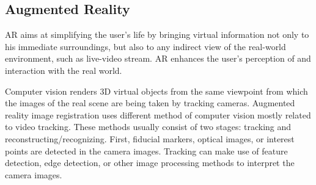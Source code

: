 



\subsection{Augmented Reality}
\label{sec:augmented_reality}

\gls{AR} aims at simplifying the user’s life by bringing virtual information not
only to his immediate surroundings, but also to any indirect view of the real-world
environment, such as live-video stream. \gls{AR} enhances the user’s perception of and
interaction with the real world. 

Computer vision renders \gls{3D} virtual objects from the same viewpoint from which the
images of the real scene are being taken by tracking cameras. Augmented reality image
registration uses different method of computer vision mostly related to video tracking.
These methods usually consist of two stages: tracking and reconstructing/recognizing. First,
fiducial markers, optical images, or interest points are detected in the camera images.
Tracking can make use of feature detection, edge detection, or other image processing
methods to interpret the camera images.

